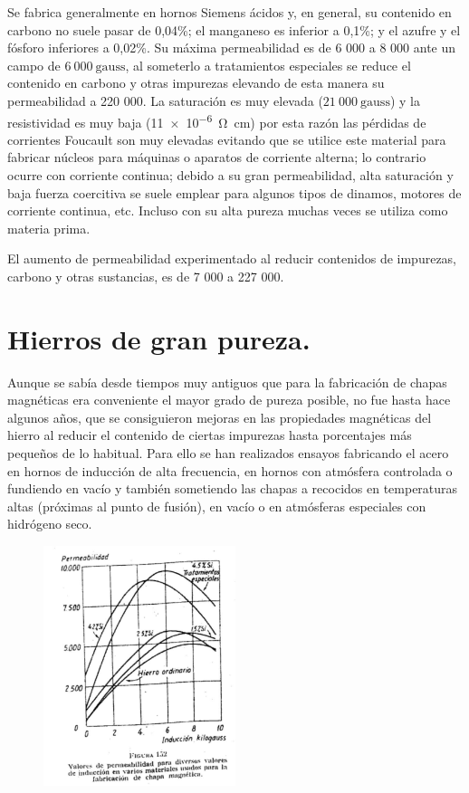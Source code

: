 \documentclass[12pt,a4paper]{article}
\begin{document}
Se fabrica generalmente en hornos Siemens ácidos y, en general, su contenido en carbono no suele pasar de 0,04\%; el manganeso es inferior a 0,1\%; y el azufre y el fósforo inferiores a 0,02\%. Su máxima permeabilidad es de 6 000 a 8 000 ante un campo de $6\ 000\ \mathrm{gauss}$, al someterlo a tratamientos especiales se reduce el contenido en carbono y otras impurezas elevando de esta manera su permeabilidad a 220 000. La saturación es muy elevada ($21\ 000\ \mathrm{gauss}$) y la resistividad es muy baja (\SI{11e-6}{\ohm\centi\metre}) por esta razón las pérdidas de corrientes Foucault son muy elevadas evitando que se utilice este material para fabricar núcleos para máquinas o aparatos de corriente alterna; lo contrario ocurre con corriente continua; debido a su gran permeabilidad, alta saturación y baja fuerza coercitiva se suele emplear para algunos tipos de dinamos, motores de corriente continua, etc. Incluso con su alta pureza muchas veces se utiliza como materia prima.

El aumento de permeabilidad experimentado al reducir contenidos de impurezas, carbono y otras sustancias, es de 7 000 a 227 000.

\section{Hierros de gran pureza.}

Aunque se sabía desde tiempos muy antiguos que para la fabricación de chapas magnéticas era conveniente el mayor grado de pureza posible, no fue hasta hace algunos años, que se consiguieron mejoras en las propiedades magnéticas del hierro al reducir el contenido de ciertas impurezas hasta porcentajes más pequeños de lo habitual. Para ello se han realizados ensayos fabricando el acero en hornos de inducción de alta frecuencia, en hornos con atmósfera controlada o fundiendo en vacío y también sometiendo las chapas a recocidos en temperaturas altas (próximas al punto de fusión), en vacío o en atmósferas especiales con hidrógeno seco. 

 \begin{figure}[H]    
    \centering         
    \includegraphics[width=0.5\textwidth]{IMAGENES LATEX/4.jpg}
\end{figure}
\end{document}
